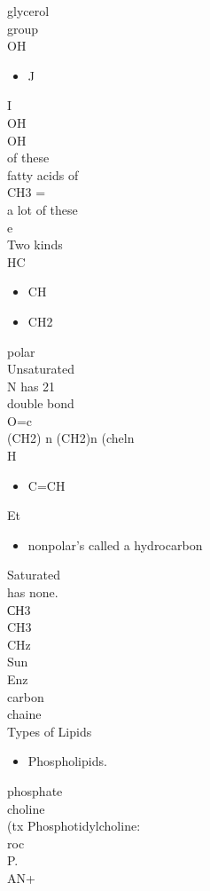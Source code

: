 \documentclass{article}
\begin{document}
glycerol\\
group\\
OH\\
\begin{itemize}\item  J
\end{itemize}
I\\
OH\\
OH\\
of these\\
fatty acids of\\
CH3 =\\
a lot of these\\
e\\
Two kinds\\
HC\begin{itemize}\item  CH \item  CH2
\end{itemize}
polar\\
Unsaturated\\
N has 21\\
double bond\\
O=c\\
(CH2) n (CH2)n (cheln\\
H\begin{itemize}\item C=CH
\end{itemize}
Et\\
\begin{itemize}\item nonpolar's
called a hydrocarbon
\end{itemize}
Saturated\\
has none.\\
СН3\\
CH3\\
CHz\\
Sun\\
Enz\\
carbon\\
chaine\\
Types of Lipids\\
\begin{itemize}\item  Phospholipids.
\end{itemize}
phosphate\\
choline\\
(tx Phosphotidylcholine:\\
roc\\
P.\\
AN+\\
\end{document}
